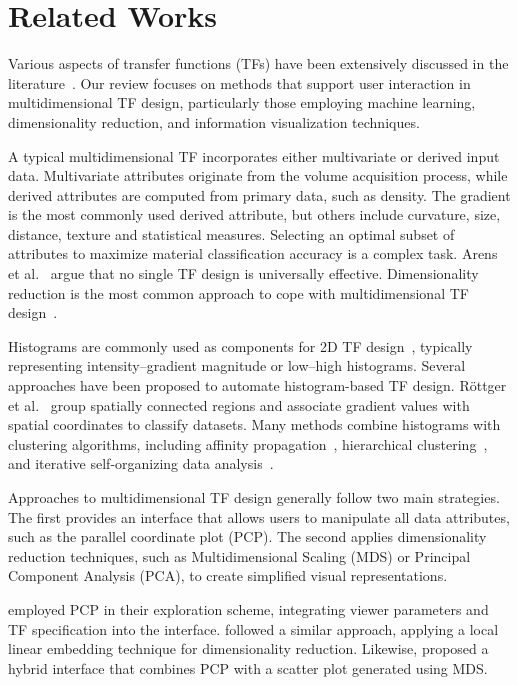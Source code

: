 \section{Related Works}
\label{sect:related-works}

Various aspects of transfer functions (TFs) have been extensively discussed in the literature~\cite{ljung2016}. Our review focuses on methods that support user interaction in multidimensional TF design, particularly those employing machine learning, dimensionality reduction, and information visualization techniques.

A typical multidimensional TF incorporates either multivariate or derived input data. Multivariate attributes originate from the volume acquisition process, while derived attributes are computed from primary data, such as density. The gradient is the most commonly used derived attribute, but others include curvature, size, distance, texture and statistical measures. Selecting an optimal subset of attributes to maximize material classification accuracy is a complex task. Arens et al.~\cite{arens2010} argue that no single TF design is universally effective. Dimensionality reduction is the most common approach to cope with multidimensional TF design~\cite{cai2017, abbasloo2016, gao2022, moura2007, zhao2010}.

Histograms are commonly used as components for 2D TF design~\cite{kniss2002}, typically representing intensity--gradient magnitude or low--high histograms. Several approaches have been proposed to automate histogram-based TF design. Röttger et al.~\cite{roettger2005} group spatially connected regions and associate gradient values with spatial coordinates to classify datasets. Many methods combine histograms with clustering algorithms, including affinity propagation~\cite{zhang2016}, hierarchical clustering~\cite{sereda2006}, and iterative self-organizing data analysis~\cite{tzeng2004}.

Approaches to multidimensional TF design generally follow two main strategies. The first provides an interface that allows users to manipulate all data attributes, such as the parallel coordinate plot (PCP). The second applies dimensionality reduction techniques, such as Multidimensional Scaling (MDS) or Principal Component Analysis (PCA), to create simplified visual representations.

\cite{tory2005} employed PCP in their exploration scheme, integrating viewer parameters and TF specification into the interface. \cite{zhao2010} followed a similar approach, applying a local linear embedding technique for dimensionality reduction. Likewise,\cite{guo2011} proposed a hybrid interface that combines PCP with a scatter plot generated using MDS.

